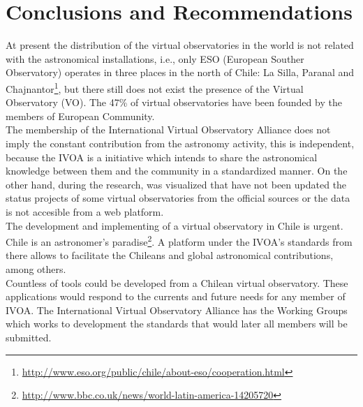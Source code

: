 \section{Conclusions and Recommendations}
At present the distribution of the virtual observatories in the world is not
related with the astronomical installations, i.e., only ESO (European Souther
Observatory) operates in three places in the north of Chile: La Silla, Paranal
and
Chajnantor\footnote{\url{http://www.eso.org/public/chile/about-eso/cooperation.html}},
but there still does not exist the presence of the Virtual Observatory (VO).
The 47\% of virtual observatories have been founded by the members of European
Community.\\

The membership of the International Virtual Observatory Alliance does not imply
the constant contribution from the astronomy activity, this is independent,
because the IVOA is a initiative which intends to share the astronomical
knowledge between them and the community in a standardized manner. On the other
hand, during the research, was visualized that have not been updated the status
projects of some virtual observatories from the official sources or the data is
not accesible from a web platform.\\

The development and implementing of a virtual observatory in Chile is urgent.
Chile is an astronomer's
paradise\footnote{\url{http://www.bbc.co.uk/news/world-latin-america-14205720}}.
A platform under the IVOA's standards from there allows to facilitate the
Chileans and global astronomical contributions, among others.\\

Countless of tools could be developed from a Chilean virtual observatory. These
applications would respond to the currents and future needs for any member of
IVOA. The International Virtual Observatory Alliance has the Working Groups
which works to development the standards that would later all members will be
submitted.\\
